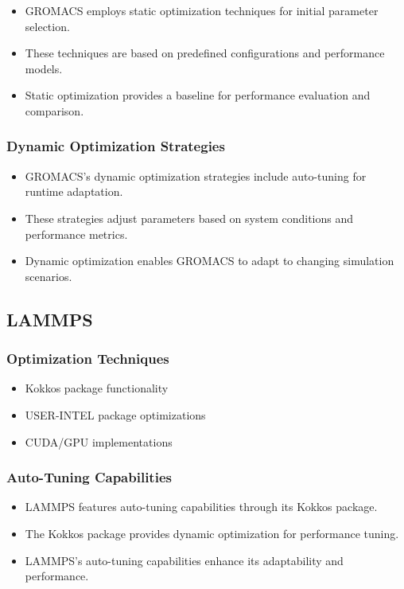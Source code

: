 \documentclass[conference]{IEEEtran}
\begin{document}
\begin{itemize}
    \item GROMACS employs static optimization techniques for initial parameter selection.
    \item These techniques are based on predefined configurations and performance models.
    \item Static optimization provides a baseline for performance evaluation and comparison.
\end{itemize}

\subsubsection{Dynamic Optimization Strategies}

\begin{itemize}
    \item GROMACS's dynamic optimization strategies include auto-tuning for runtime adaptation.
    \item These strategies adjust parameters based on system conditions and performance metrics.
    \item Dynamic optimization enables GROMACS to adapt to changing simulation scenarios.
\end{itemize}

\subsection{LAMMPS}

\subsubsection{Optimization Techniques}
\begin{itemize}
    \item Kokkos package functionality
    \item USER-INTEL package optimizations
    \item CUDA/GPU implementations
\end{itemize}

\subsubsection{Auto-Tuning Capabilities}

\begin{itemize}
    \item LAMMPS features auto-tuning capabilities through its Kokkos package.
    \item The Kokkos package provides dynamic optimization for performance tuning.
    \item LAMMPS's auto-tuning capabilities enhance its adaptability and performance.
\end{itemize}
\end{document}
